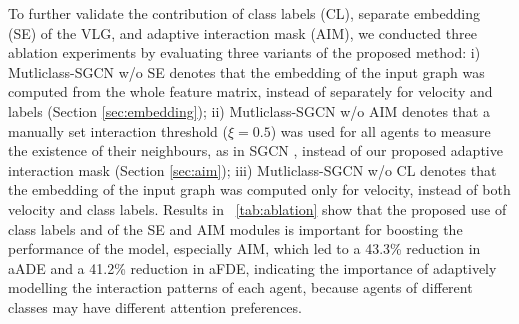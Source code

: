 \documentclass{article}
\begin{document}
\begin{table}[t]
\caption{Performance comparison with Semantics-STGCNN.}
\label{tab:sotacomparison}
\centering
{}
\vspace{-5mm}\end{table}

\begin{table}[t]
\caption{Ablation study results.}
\label{tab:ablation}
\centering
{}
\end{table}


To further validate the contribution of class labels (CL), separate embedding (SE) of the VLG, and adaptive interaction mask (AIM), we conducted three ablation experiments by evaluating three variants of the proposed method: i) Mutliclass-SGCN w/o SE denotes that the embedding of the input graph was computed from the whole feature matrix, instead of separately for velocity and labels (Section \ref{sec:embedding}); ii) Mutliclass-SGCN w/o AIM denotes that a manually set interaction threshold ($\xi = 0.5$) was used for all agents to measure the existence of their neighbours, as in SGCN \cite{shi2021sgcn}, instead of our proposed adaptive interaction mask (Section \ref{sec:aim}); iii) Mutliclass-SGCN w/o CL denotes that the embedding of the input graph was computed only for velocity, instead of both velocity and class labels. Results in \tablename~\ref{tab:ablation} show that the proposed use of class labels and of the SE and AIM modules is important for boosting the performance of the model, especially AIM, which led to a 43.3\% reduction in aADE and a 41.2\% reduction in aFDE, indicating the importance of adaptively modelling the interaction patterns of each agent,
because agents of different classes may have different attention preferences.
\end{document}
